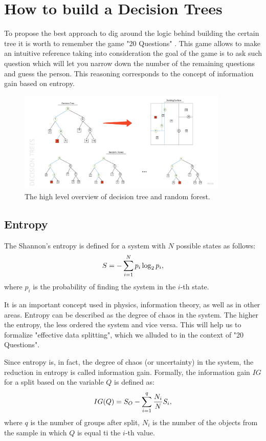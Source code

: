 \documentclass{article}
\begin{document}
\section{How to build a Decision Trees}
To propose the best approach to dig around the logic behind building the certain tree it is worth to remember the game "20 Questions" \cite{Stocco2015}. This game allows to make an intuitive reference taking into consideration the goal of the game is to ask such question which will let you narrow down the number of the remaining questions and guess the person. This reasoning corresponds to the concept of information gain based on entropy.
\begin{figure}[h]
    \centering \includegraphics[width=10cm]{images/DTrees.jpg}
    \caption {The high level overview of decision tree and random forest.}
    \label{fig:ct_spine}
\end{figure}


\subsection{Entropy}
The Shannon's entropy \cite{Lotfi2010} is defined for a system with $N$ possible states as follows:
\[ \Large S = -\sum_{i=1}^{N}p_i \log_2{p_i}, \]
where $p_i$ is the probability of finding the system in the $i$-th state. 

It is an important concept used in physics, information theory, as well as in other areas. Entropy can be described as the degree of chaos in the system. The higher the entropy, the less ordered the system and vice versa. This will help us to formalize "effective data splitting", which we alluded to in the context of "20 Questions".

Since entropy is, in fact, the degree of chaos (or uncertainty) in the system, the reduction in entropy is called information gain. Formally, the information gain $IG$ for a split based on the variable $Q$ is defined as: 
\[ \Large IG(Q) = S_O - \sum_{i=1}^{q}\frac{N_i}{N}S_i, \]
where $q$ is the number of groups after split, $N_i$ is the number of the objects from the sample in which $Q$ is equal ti the $i$-th value. 
\end{document}
